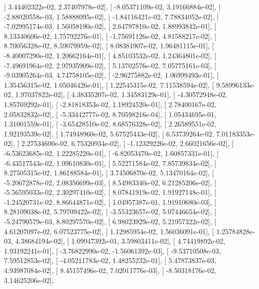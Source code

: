 \documentclass{article}
\begin{document}
       [  3.44402322e-02,   2.37407978e-02],
       [ -8.05371109e-02,   3.19166884e-02],
       [ -2.88020558e-03,   1.58888095e-02],
       [ -1.84116421e-02,   7.78834052e-02],
       [ -7.02995174e-03,   1.56058190e-02],
       [  2.64797810e-02,   1.88993842e-01],
       [  8.13340606e-02,   1.75792276e-01],
       [ -1.75691126e-02,   4.81588217e-02],
       [  8.70056328e-02,   8.59079959e-02],
       [  8.08381907e-02,   1.96481115e-01],
       [ -8.40007290e-02,   1.20662164e-01],
       [  4.85103532e-02,   1.24364801e-02],
       [ -7.49691964e-02,   2.97935909e-02],
       [  5.13702576e-02,   7.05775161e-03],
       [ -9.03905264e-03,   4.74758105e-02],
       [ -2.96275882e-02,   1.06999493e-01],
       [  1.35456315e-02,   1.05046426e-01],
       [  1.22545315e-02,   7.11538594e-02],
       [  9.58996133e-02,   1.97037822e-02],
       [  4.38335207e-02,   1.34583129e-01],
       [ -4.30572948e-02,   1.85769292e-01],
       [ -2.81818353e-02,   1.18924520e-01],
       [  2.78400167e-02,   2.05832832e-02],
       [ -5.33442777e-02,   8.70598216e-04],
       [  1.05434695e-01,   1.31001559e-01],
       [ -3.65428510e-02,   8.68576328e-02],
       [  2.26589551e-02,   1.92193539e-02],
       [  1.74948960e-02,   5.67525443e-02],
       [  6.53739264e-02,   7.01183353e-02],
       [  2.27534600e-02,   6.75320934e-02],
       [ -1.12329226e-02,   2.66021656e-02],
       [ -6.53623685e-02,   1.22285220e-01],
       [ -6.82053470e-02,   1.60857331e-01],
       [ -6.43517543e-02,   1.09610830e-01],
       [  5.52271584e-02,   7.85739834e-02],
       [  8.27505315e-02,   1.86188584e-01],
       [  3.74506870e-02,   5.13470164e-02],
       [ -5.20672878e-02,   2.08356699e-03],
       [  8.54983340e-02,   6.21285206e-02],
       [ -5.56595033e-02,   2.30297410e-02],
       [  8.07841919e-02,   1.91927148e-01],
       [ -1.24520731e-02,   8.86644871e-02],
       [  1.04957387e-01,   1.91910680e-03],
       [  8.28109038e-02,   5.79709422e-02],
       [ -3.55323657e-02,   5.07446654e-02],
       [ -5.24790579e-03,   8.80297570e-02],
       [  6.98023929e-02,   5.21957322e-02],
       [  4.61207097e-02,   6.07523775e-02],
       [  1.12985954e-02,   1.56036091e-01],
       [  1.25784828e-03,   4.38684194e-02],
       [  1.09947392e-01,   3.59803411e-02],
       [  4.74419892e-02,   1.93192241e-01],
       [ -3.76822990e-02,  -1.56061392e-03],
       [ -9.53710508e-03,   7.59512853e-02],
       [ -4.05211783e-02,   1.48255232e-01],
       [  5.47873837e-03,   4.93987084e-02],
       [  8.45157496e-02,   7.02011776e-03],
       [ -8.50318176e-02,   3.14625206e-02],
\end{document}
